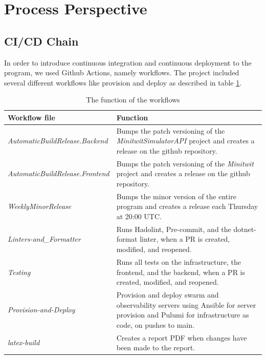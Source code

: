\section{Process Perspective}

\subsection{CI/CD Chain}

In order to introduce continuous integration and continuous deployment to the program, we used Github Actions, namely workflows. The project included several different workflows like provision and deploy as described in table \ref{tab:workflows}.

\begin{table}[H]
    \centering
    \begin{tabular}{|p{} | p{}|}
        \hline
        \textbf{Workflow file} & \textbf{Function}\\
        \hline
        \textit{AutomaticBuildRelease.Backend} &  Bumps the patch versioning of the \textit{MinitwitSimulatorAPI} project and creates a release on the github repository.\\
        \textit{AutomaticBuildRelease.Frontend} & Bumps the patch versioning of the \textit{Minitwit} project and creates a release on the github repository.\\
        \textit{WeeklyMinorRelease} & Bumps the minor version of the entire program and creates a release each Thursday at 20:00 UTC.\\
        \textit{Linters-and\_Formatter} & Runs Hadolint, Pre-commit, and the dotnet-format linter, when a PR is created, modified, and reopened.\\
        \textit{Testing} & Runs all tests on the infrastructure, the frontend, and the backend, when a PR is created, modified, and reopened.\\
        \textit{Provision-and-Deploy} & Provision and deploy swarm and observability servers using Ansible for server provision and Pulumi for infrastructure as code, on pushes to main.\\
        \textit{latex-build} & Creates a report PDF when changes have been made to the report.\\
        \hline
    \end{tabular}
    \caption{The function of the workflows}
    \label{tab:workflows}
\end{table}

